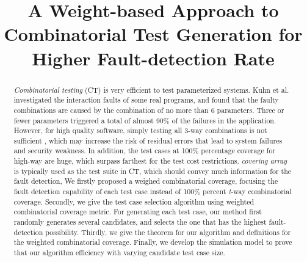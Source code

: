 \documentclass[10pt,conference, compsocconf]{IEEEtran}
\date{}
\begin{document}
\begin{CJK}{UTF8}{gkai}

\title{A  Weight-based Approach to Combinatorial Test
  Generation for Higher Fault-detection Rate}

\author{
}

 \maketitle
\begin{abstract}
\emph{Combinatorial testing} (CT) is very efficient to test parameterized systems.
Kuhn et al. investigated the interaction faults of some real programs, 
and found that the faulty combinations are caused by the combination of 
no more than 6 parameters. 
Three or fewer parameters triggered a total of almost 90\% of the 
failures in the application\cite{Hagar2015computer}.
However, for high quality software,
simply testing all 3-way combinations is not sufficient \cite{kuhn02SEW},
which may increase the risk of residual errors that lead to system failures and 
security weakness\cite{Kuhn2010NIST}. 
In addition,
the test cases at 100\% percentage coverage for high-way are huge, which surpass farthest 
for the test cost restrictions.
\emph{covering array} is typically used as the test suite in CT, 
which should convey much information for the fault detection, 
We firstly proposed a weighed combinatorial coverage,
focusing the fault detection capability of each test case instead of
100\% percent \emph{t}-way combinatorial coverage.
Secondly, we give the test case selection algorithm using 
weighted combinatorial coverage metric. 
For generating each test case, 
our method first randomly generates several candidates,
and selects the one that has the highest fault-detection possibility. 
Thirdly, we give the theorem for our algorithm and definitions for the 
weighted combinatorial coverage. 
Finally, we develop the simulation model to prove that our algorithm 
efficiency with varying candidate test case size. 
\end{abstract}



\end{CJK}
\end{document}
